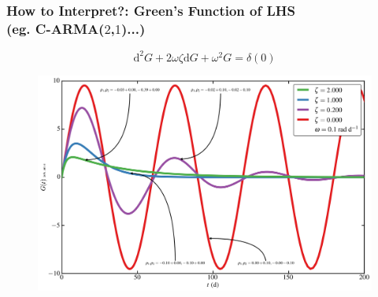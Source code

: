 \documentclass[hyperref={pdfpagelabels=false}]{beamer}
\begin{document}

\begin{frame}
\frametitle{How to Interpret?: Green's Function of LHS\\(eg. C-ARMA($2$,$1$)...)}
  \begin{equation*}\label{eq:CARMAGF} \mathrm{d}^{2}G + 2\omega\zeta \mathrm{d}G + \omega^{2}G = \delta(0) \end{equation*}
  \begin{figure}
    \includegraphics[scale=0.06]{images/CARMA(2,1)_GF.jpg}
  \end{figure}
\end{frame}

\end{document}
